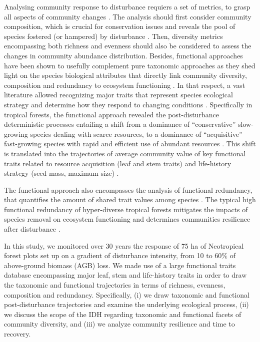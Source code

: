 \documentclass[fleqn,10pt]{ArtEcoFoG} %
\begin{document}
Analysing community response to disturbance requiers a set of metrics,
to grasp all aspects of community changes
\citep{Sheil2003, Shea2004, Mayfield2010}. The analysis should first
consider community composition, which is crucial for conservation issues
and reveals the pool of species fostered (or hampered) by disturbance
\citep{Lavorel2002, Bellwood2006}. Then, diversity metrics encompassing
both richness and evenness should also be considered to assess the
changes in community abundance distribution. Besides, functional
approaches have been shown to usefully complement pure taxonomic
approaches as they shed light on the species biological attributes that
directly link community diversity, composition and redundancy to
ecosystem functioning \citep{Violle7b, Baraloto2012a}. In that respect,
a vast literature allowed recognizing major traits that represent
species ecological strategy and determine how they respond to changing
conditions \citep{Diaz2005}. Specifically in tropical forests, the
functional approach revealed the post-disturbance deterministic
processes entailing a shift from a dominance of ``conservative''
slow-growing species dealing with scarce resources, to a dominance of
``acquisitive'' fast-growing species with rapid and efficient use of
abundant resources \citep{Rees2001, Reich2014, Herault2011}. This shift
is translated into the trajectories of average community value of key
functional traits related to resource acquisition (leaf and stem traits)
and life-history strategy (seed mass, maximum size)
\citep{Wright2004, TerSteege2006, Westoby2006a, Chave2009b}.

The functional approach also encompasses the analysis of functional
redundancy, that quantifies the amount of shared trait values among
species \citep{Carmona2016}. The typical high functional redundancy of
hyper-diverse tropical forests \citep{Bellwood2006} mitigates the
impacts of species removal on ecosystem functioning and determines
communities resilience after disturbance \citep{Elmqvist2003, Diaz2005}.

In this study, we monitored over 30 years the response of 75 ha of
Neotropical forest plots set up on a gradient of disturbance intensity,
from 10 to 60\% of above-ground biomass (AGB) loss. We made use of a
large functional traits database encompassing major leaf, stem and
life-history traits in order to draw the taxonomic and functional
trajectories in terms of richness, evenness, composition and redundancy.
Specifically, (i) we draw taxonomic and functional post-disturbance
trajectories and examine the underlying ecological process, (ii) we
discuss the scope of the IDH regarding taxonomic and functional facets
of community diversity, and (iii) we analyze community resilience and
time to recovery.
\end{document}
